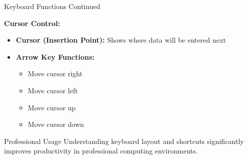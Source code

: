 \documentclass[aspectratio=169]{beamer}
\begin{document}
\begin{frame}{Keyboard Functions Continued}
    
    \textbf{Cursor Control:}
    \begin{itemize}
        \item \textbf{Cursor (Insertion Point):} Shows where data will be entered next
        \item \textbf{Arrow Key Functions:}
        \begin{itemize}
            \item Move cursor right
            \item Move cursor left  
            \item Move cursor up
            \item Move cursor down
        \end{itemize}
    \end{itemize}
    
    \begin{exampleblock}{Professional Usage}
        Understanding keyboard layout and shortcuts significantly improves productivity in professional computing environments.
    \end{exampleblock}
\end{frame}
\end{document}

